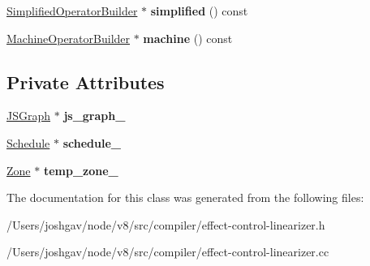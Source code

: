 \begin{DoxyCompactItemize}
\item 
\hyperlink{classv8_1_1internal_1_1compiler_1_1_simplified_operator_builder}{Simplified\+Operator\+Builder} $\ast$ {\bfseries simplified} () const \hypertarget{classv8_1_1internal_1_1compiler_1_1_effect_control_linearizer_a25d35003ab4db9f7880162f49872b36e}{}\label{classv8_1_1internal_1_1compiler_1_1_effect_control_linearizer_a25d35003ab4db9f7880162f49872b36e}

\item 
\hyperlink{classv8_1_1internal_1_1compiler_1_1_machine_operator_builder}{Machine\+Operator\+Builder} $\ast$ {\bfseries machine} () const \hypertarget{classv8_1_1internal_1_1compiler_1_1_effect_control_linearizer_ab0f653a4964a35173b154fe4e5bc950f}{}\label{classv8_1_1internal_1_1compiler_1_1_effect_control_linearizer_ab0f653a4964a35173b154fe4e5bc950f}

\end{DoxyCompactItemize}
\subsection*{Private Attributes}
\begin{DoxyCompactItemize}
\item 
\hyperlink{classv8_1_1internal_1_1compiler_1_1_j_s_graph}{J\+S\+Graph} $\ast$ {\bfseries js\+\_\+graph\+\_\+}\hypertarget{classv8_1_1internal_1_1compiler_1_1_effect_control_linearizer_ae54c9b1c575397acf72a6833afdb4063}{}\label{classv8_1_1internal_1_1compiler_1_1_effect_control_linearizer_ae54c9b1c575397acf72a6833afdb4063}

\item 
\hyperlink{classv8_1_1internal_1_1compiler_1_1_schedule}{Schedule} $\ast$ {\bfseries schedule\+\_\+}\hypertarget{classv8_1_1internal_1_1compiler_1_1_effect_control_linearizer_a67510b7e49b6d1e1ade18bc4af7220d1}{}\label{classv8_1_1internal_1_1compiler_1_1_effect_control_linearizer_a67510b7e49b6d1e1ade18bc4af7220d1}

\item 
\hyperlink{classv8_1_1internal_1_1_zone}{Zone} $\ast$ {\bfseries temp\+\_\+zone\+\_\+}\hypertarget{classv8_1_1internal_1_1compiler_1_1_effect_control_linearizer_a9d50acdf180e890379d6248df5fa89dd}{}\label{classv8_1_1internal_1_1compiler_1_1_effect_control_linearizer_a9d50acdf180e890379d6248df5fa89dd}

\end{DoxyCompactItemize}


The documentation for this class was generated from the following files\+:\begin{DoxyCompactItemize}
\item 
/\+Users/joshgav/node/v8/src/compiler/effect-\/control-\/linearizer.\+h\item 
/\+Users/joshgav/node/v8/src/compiler/effect-\/control-\/linearizer.\+cc\end{DoxyCompactItemize}
